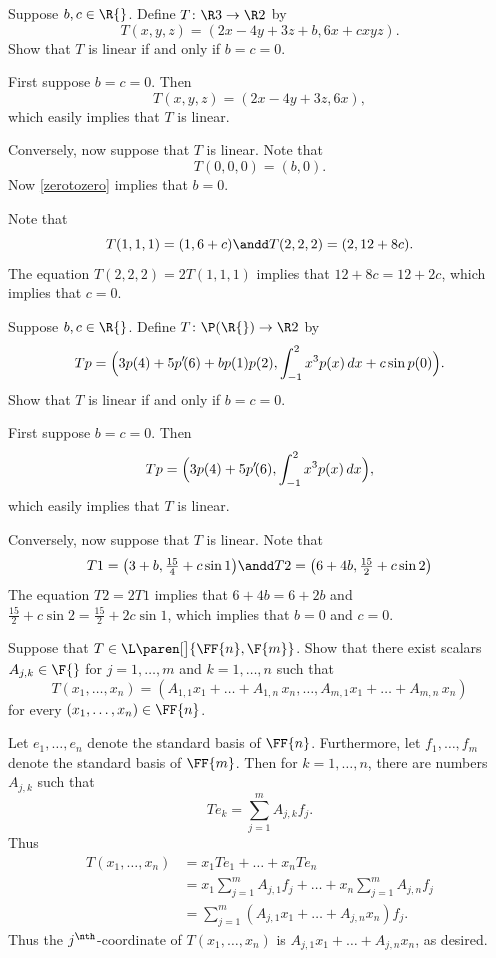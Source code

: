 
\exercise
Suppose $b, c \in \R{}$. Define $T \colon \R3 \to \R2$ by
\[
T(x, y, z) = (2x -4y + 3z + b, 6x + c xyz).
\]
Show that $T$ is linear if and only if $b = c = 0$.

\begin{Solution}
First suppose $b = c = 0$. Then
\[
T(x, y, z) = (2x -4y + 3z, 6x),
\]
which easily implies that $T$ is linear.

Conversely, now suppose that $T$ is linear. Note that
\[
T(0,0, 0) = (b ,0).
\]
Now \ref{zerotozero} implies that $b = 0$.

Note that
\[
T(1, 1, 1) = (1, 6 + c) \andd T(2, 2, 2) = (2, 12 + 8c).
\]
The equation $T(2, 2, 2) = 2T(1,1,1)$ implies that $12 + 8c = 12 + 2c$, which implies that $c = 0$.
\end{Solution}

\exercise
Suppose $b, c \in \R{}$. Define $T \colon \P(\R{}) \to \R2$ by
\[
Tp = \Bigl(3p(4) + 5p' \! (6) + b p(1) p(2), \int_{-1}^2 x^3 p(x)\, dx + c \sin p(0)\Bigr).
\]
Show that $T$ is linear if and only if $b = c = 0$.

\begin{Solution}
First suppose $b = c = 0$. Then
\[
Tp = \Bigl(3p(4) + 5p' \! (6), \int_{-1}^2 x^3 p(x)\, dx \Bigr),
\]
which easily implies that $T$ is linear.

Conversely, now suppose that $T$ is linear. Note that
\[
T1 = \bigl(3 + b, \tfrac{15}{4} + c \sin 1\bigr) \andd T2 = \bigl(6 + 4b, \tfrac{15}{2} + c \sin 2\bigr)
\]
The equation $T2 = 2T1$ implies that $6 + 4b = 6 + 2b$ and $\frac{15}{2} + c \sin 2 = \frac{15}{2} + 2 c \sin 1$, which implies that $b = 0$ and $c = 0$.

\end{Solution}

\exercise
Suppose that $T \in \L\paren[\big]{\FF{n}, \F{m}}$.  Show that there exist scalars $A_{j, k} \in \F{}$ for $j = 1, \dots, m$ and $k = 1, \dots, n$ such that
\[
T(x_1, \dots, x_n) =
(A_{1,1}x_1 + \dots + A_{1,n}\,x_n, \dots, A_{m,1}x_1 + \dots + A_{m,n}\,x_n)
\]
for every $(x_1, \dots, x_n) \in \FF{n}$.

\begin{Solution}
Let $e_1, \dots, e_n$ denote the standard basis of $\FF{n}$. Furthermore, let $f_1, \dots, f_m$ denote the standard basis of $\FF{m}$. Then for $k = 1, \dots, n$, there are numbers $A_{j, k}$ such that
\[
Te_k = \sum_{j=1}^m A_{j, k} f_j.
\]
Thus
\begin{align*}
T(x_1, \dots, x_n) &= x_1 Te_1 + \dots + x_n Te_n \\
&= x_1 \sum_{j=1}^m A_{j, 1} f_j + \dots + x_n \sum_{j=1}^m A_{j, n} f_j \\
&= \sum_{j=1}^m (A_{j,1} x_1 + \dots + A_{j, n}x_n ) f_j.
\end{align*}
Thus the $j^\nth$-coordinate of $T(x_1, \dots, x_n)$ is $A_{j,1} x_1 + \dots + A_{j, n}x_n$, as desired.
\end{Solution}

